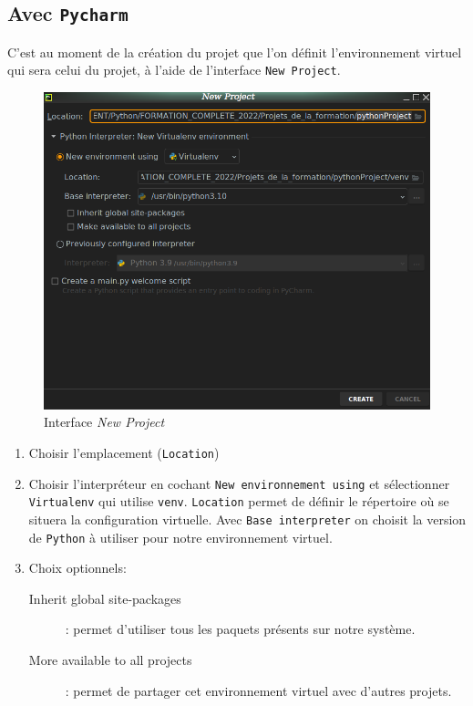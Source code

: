 \documentclass[a4paper,11pt]{book}
\begin{document}
\subsection*{Avec \texttt{Pycharm}}
C'est au moment de la création du projet que l'on définit l'environnement virtuel qui sera celui du projet, à l'aide de l'interface \texttt{New Project}.
\begin{figure}[h]
\begin{center}
\includegraphics[scale=0.4]{IMG/Pycharm-12.png}
\caption{Interface \textit{New Project}}
\end{center}
\end{figure}
\medskip

\begin{enumerate}
	\item Choisir l'emplacement (\texttt{Location})
	\item Choisir l'interpréteur en cochant \texttt{New environnement using} et sélectionner \texttt{Virtualenv} qui utilise \texttt{venv}. \texttt{Location} permet de définir le répertoire où se situera la configuration virtuelle. Avec \texttt{Base interpreter} on choisit la version de \texttt{Python} à utiliser pour notre environnement virtuel.
	\item Choix optionnels:
	\begin{description}
		\item[Inherit global site-packages]: permet d'utiliser tous les paquets présents sur notre système.
		\item[More available to all projects]: permet de partager cet environnement virtuel avec d'autres projets.
	\end{description}
\end{enumerate}
\medskip
\end{document}
